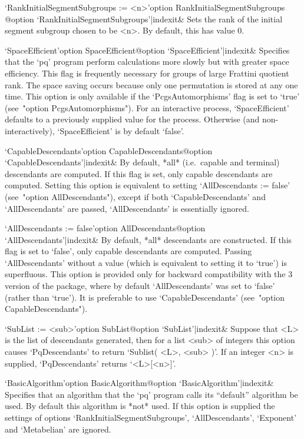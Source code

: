 \>`RankInitialSegmentSubgroups := <n>'{option RankInitialSegmentSubgroups}%
@{option `RankInitialSegmentSubgroups'|indexit}&
Sets the rank of the initial  segment  subgroup  chosen  to  be  <n>.  By
default, this has value 0.

\>`SpaceEfficient'{option SpaceEfficient}@{option `SpaceEfficient'|indexit}&
Specifies that the `pq' program perform calculations more slowly but  with
greater space efficiency. This flag is frequently necessary for groups of
large Frattini quotient rank. The space saving occurs  because  only  one
permutation is stored at any one time. This option is only  available  if
the   `PcgsAutomorphisms'   flag   is   set   to   `true'    (see~"option
PcgsAutomorphisms").  For  an   interactive   process,   `SpaceEfficient'
defaults to a previously supplied value for the process.  Otherwise  (and
non-interactively), `SpaceEfficient' is by default `false'.


\>`CapableDescendants'{option CapableDescendants}@{option `CapableDescendants'|indexit}&
By default, *all* (i.e.~capable and terminal) descendants  are  computed.
If this flag is set, only capable descendants are computed. Setting  this
option is equivalent to setting `AllDescendants  :=  false'  (see~"option
AllDescendants"),    except    if    both    `CapableDescendants'     and
`AllDescendants' are passed, `AllDescendants' is essentially ignored.

\>`AllDescendants := false'{option AllDescendants}@{option `AllDescendants'|indexit}&
By default, *all* descendants are constructed. If this  flag  is  set  to
`false', only capable descendants are computed. Passing  `AllDescendants'
without a value  (which  is  equivalent  to  setting  it  to  `true')  is
superfluous. This option is provided only for backward compatibility with
the  {\GAP}  3  version  of  the  {\ANUPQ}  package,  where  by   default
`AllDescendants'  was  set  to  `false'  (rather  than  `true').  It   is
preferable to use `CapableDescendants' (see~"option CapableDescendants").

\>`SubList := <sub>'{option SubList}@{option `SubList'|indexit}&
Suppose that <L> is the list of descendants generated, then  for  a  list
<sub> of integers this option causes `PqDescendants' to return  `Sublist(
<L>, <sub> )'. If an integer <n>  is  supplied,  `PqDescendants'  returns
`<L>[<n>]'.

\>`BasicAlgorithm'{option BasicAlgorithm}@{option `BasicAlgorithm'|indexit}&
Specifies that an algorithm that the `pq' program  calls  its  ``default''
algorithm be used. By default this  algorithm  is  *not*  used.  If  this
option is supplied the settings of options `RankInitialSegmentSubgroups',
`AllDescendants', `Exponent' and `Metabelian' are ignored.

